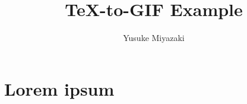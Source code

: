 \documentclass[uplatex]{jsarticle}
\title{\TeX-to-GIF Example}
\author{Yusuke Miyazaki}
\begin{document}
\maketitle

\section{Lorem ipsum}
\lipsum[1-2]
\end{document}
